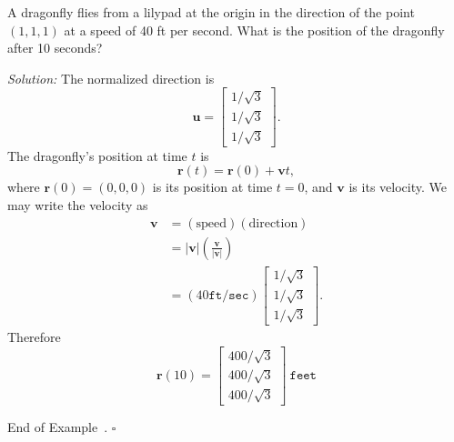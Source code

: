 \documentclass[10pt]{article}
\theoremstyle{definition}
\newtheorem{example}[theorem]{Example}
\renewenvironment{example}
{\begin{oldexample}}
  {\par\smallskip\hfill   End of Example~\theexample. $\square$    \par\end{oldexample}}
\newcommand{\1}[1]{\textbf{1}_{\left[#1\right]}} %
\begin{document}
\begin{example}
  A dragonfly flies from a lilypad at the origin in the direction of the
  point $(1,1,1)$ at a speed of 40 ft per second. What is the position of the
  dragonfly after 10 seconds?

  \textit{Solution:} The normalized direction is
  \begin{equation*}
    \boldsymbol{u} =
    \begin{bmatrix}
      1/\sqrt{3}\\
      1/\sqrt{3}\\
      1/\sqrt{3}
    \end{bmatrix}.
  \end{equation*}
  The dragonfly's position at time $t$ is
  \begin{equation*}
    \boldsymbol{r}(t) =
    \boldsymbol{r}(0)
    + \boldsymbol{v}t,
  \end{equation*}
  where $\boldsymbol{r}(0)=(0,0,0)$ is its position at time $t=0$, and
  $\boldsymbol{v}$ is its velocity. We may write the velocity as
  \begin{align*}
    \boldsymbol{v} 
    &= (\text{speed})(\text{direction}) \\
    &= |\boldsymbol{v}|\left(  \frac{\boldsymbol{v}}{|\boldsymbol{v}|} \right)\\
    &= (40\mathtt{ft}/\mathtt{sec})
      \begin{bmatrix}
        1/\sqrt{3}\\
        1/\sqrt{3}\\
        1/\sqrt{3}
      \end{bmatrix}.
  \end{align*}
  Therefore
  \begin{equation*}
    \boldsymbol{r}(10) =
    \begin{bmatrix}
      400/\sqrt{3}\\
      400/\sqrt{3}\\
      400/\sqrt{3}
    \end{bmatrix}
    \ \mathtt{feet}
  \end{equation*}
\end{example}
\end{document}
